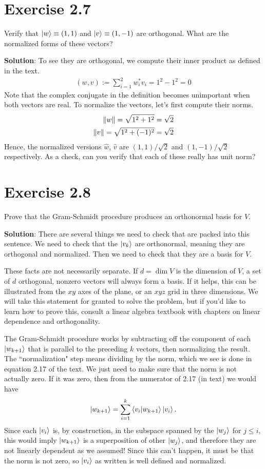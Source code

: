 \documentclass{book}
\begin{document}
\section*{Exercise 2.7}
    Verify that $\ket{w} \equiv (1, 1)$ and $\ket{v} \equiv (1, -1)$ are orthogonal. What are the normalized forms of these vectors?
    
    \textbf{Solution}: To see they are orthogonal, we compute their inner product as defined in the text.
    \begin{align}
        (w,v) := \sum_{i=1}^2 w_i^* v_i = 1^2 - 1^2 = 0
    \end{align}
    Note that the complex conjugate in the definition becomes unimportant when both vectors are real. To normalize the vectors, let's first compute their norms.
    \begin{align}
        \norm{w} = \sqrt{1^2 + 1^2} = \sqrt{2} \\
        \norm{v} = \sqrt{1^2 + (-1)^2} = \sqrt{2}
    \end{align}
    Hence, the normalized versions $\hat{w}$, $\hat{v}$ are $(1,1)/\sqrt{2}$ and $(1,-1)/\sqrt{2}$ respectively. As a check, can you verify that each of these really has unit norm?
    
\section*{Exercise 2.8}
    Prove that the Gram-Schmidt procedure produces an orthonormal basis for $V$.
    
    \textbf{Solution}: There are several things we need to check that are packed into this sentence. We need to check that the $\ket{v_k}$ are orthonormal, meaning they are orthogonal and normalized. Then we need to check that they are a basis for $V$. 
    
    These facts are not necessarily separate. If $d=\dim{V}$ is the dimension of $V$, a set of $d$ orthogonal, nonzero vectors will always form a basis. If it helps, this can be illustrated from the $xy$ axes of the plane, or an $xyz$ grid in three dimensions. We will take this statement for granted to solve the problem, but if you'd like to learn how to prove this, consult a linear algebra textbook with chapters on linear dependence and orthogonality.
    
    The Gram-Schmidt procedure works by subtracting off the component of each $\ket{w_{k+1}}$ that is parallel to the preceding $k$ vectors, then normalizing the result. The ``normalization" step means dividing by the norm, which we see is done in equation 2.17 of the text. We just need to make sure that the norm is not actually zero. If it was zero, then from the numerator of 2.17 (in text) we would have
    \begin{align}
        \ket{w_{k+1}} = \sum_{i=1}^k \braket{v_i}{w_{k+1}} \ket{v_i}.
    \end{align}
    Since each $\ket{v_i}$ is, by construction, in the subspace spanned by the $\ket{w_j}$ for $j \leq i$, this would imply $\ket{w_{k+1}}$ is a superposition of other $\ket{w_j}$, and therefore they are not linearly dependent as we assumed! Since this can't happen, it must be that the norm is not zero, so $\ket{v_i}$ as written is well defined and normalized. 
    
\end{document}

